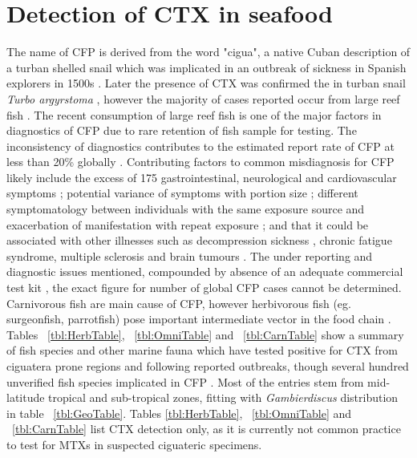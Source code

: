 \documentclass[12pt]{article}
\begin{document}
\section{Detection of CTX in seafood}
The name of CFP is derived from the word "cigua", a native Cuban description of a turban shelled snail which was implicated in an outbreak of sickness in Spanish explorers in 1500s \cite{gudger1930poisonous}. Later the presence of CTX was confirmed the in turban snail \emph{Turbo argyrstoma} \cite{yasumoto1976toxicity}, however the majority of cases reported occur from large reef fish \cite{hokama2001ciguatera,lewis2001changing,dechraoui2005use,laurent2005ciguatera}. The recent consumption of large reef fish is one of the major factors in diagnostics of CFP due to rare retention of fish sample for testing.
The inconsistency of diagnostics contributes to the estimated report rate of CFP at less than 20\% globally \cite{dickey2010ciguatera}. Contributing factors to common misdiagnosis for CFP likely include the excess of 175 gastrointestinal, neurological and cardiovascular symptoms \cite{sims1987theoretical}; potential variance of symptoms with portion size \cite{wong2008features,mak2013pacific}; different symptomatology between individuals with the same exposure source and exacerbation of manifestation with repeat exposure \cite{bagnis1979clinical,glaziou1993study}; and that it could be associated with other illnesses such as decompression sickness \cite{adams1993outbreak}, chronic fatigue syndrome, multiple sclerosis \cite{lindsay1997chronic,ting2001ciguatera} and brain tumours \cite{lindsay1997chronic}.
The under reporting and diagnostic issues mentioned, compounded by absence of an adequate commercial test kit \cite{wong2005study}, the exact figure for number of global CFP cases cannot be determined. Carnivorous fish are main cause of CFP, however herbivorous fish (eg. surgeonfish, parrotfish) pose important intermediate vector in the food chain \cite{cruz2006macroalgal,randall1958review,mak2013pacific}.%
Tables ~\ref{tbl:HerbTable}, ~\ref{tbl:OmniTable} and ~\ref{tbl:CarnTable} show a summary of fish species and other marine fauna which have tested positive for CTX from ciguatera prone regions and following reported outbreaks, though several hundred unverified fish species implicated in CFP \cite{}. %
Most of the entries stem from mid-latitude tropical and sub-tropical zones, fitting with \emph{Gambierdiscus} distribution in table ~\ref{tbl:GeoTable}. Tables \ref{tbl:HerbTable}, ~\ref{tbl:OmniTable} and ~\ref{tbl:CarnTable} list CTX detection only, as it is currently not common practice to test for MTXs in suspected ciguateric specimens. 
\end{document}
